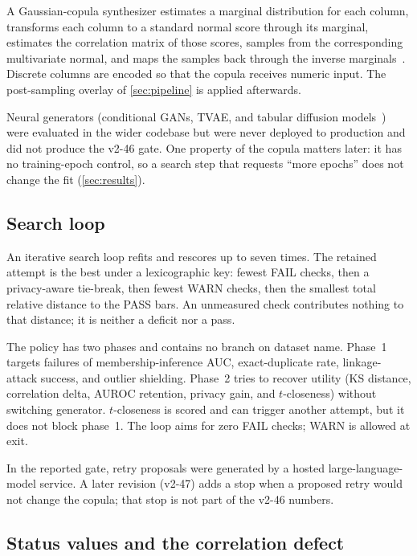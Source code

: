 \documentclass[11pt,a4paper]{article}
\begin{document}
A Gaussian-copula synthesizer estimates a marginal distribution for each column, transforms each column to a standard normal score through its marginal, estimates the correlation matrix of those scores, samples from the corresponding multivariate normal, and maps the samples back through the inverse marginals~\cite{sklar1959,patki2016}. Discrete columns are encoded so that the copula receives numeric input. The post-sampling overlay of \cref{sec:pipeline} is applied afterwards.

Neural generators (conditional GANs, TVAE, and tabular diffusion models~\cite{xu2019,kotelnikov2023}) were evaluated in the wider codebase but were never deployed to production and did not produce the v2-46 gate. One property of the copula matters later: it has no training-epoch control, so a search step that requests ``more epochs'' does not change the fit (\cref{sec:results}).

\subsection{Search loop}\label{sec:search}

An iterative search loop refits and rescores up to seven times. The retained attempt is the best under a lexicographic key: fewest FAIL checks, then a privacy-aware tie-break, then fewest WARN checks, then the smallest total relative distance to the PASS bars. An unmeasured check contributes nothing to that distance; it is neither a deficit nor a pass.

The policy has two phases and contains no branch on dataset name. Phase~1 targets failures of membership-inference AUC, exact-duplicate rate, linkage-attack success, and outlier shielding. Phase~2 tries to recover utility (KS distance, correlation delta, AUROC retention, privacy gain, and $t$-closeness) without switching generator. $t$-closeness is scored and can trigger another attempt, but it does not block phase~1. The loop aims for zero FAIL checks; WARN is allowed at exit.

In the reported gate, retry proposals were generated by a hosted large-language-model service. A later revision (v2-47) adds a stop when a proposed retry would not change the copula; that stop is not part of the v2-46 numbers.

\subsection{Status values and the correlation defect}\label{sec:status}
\end{document}
